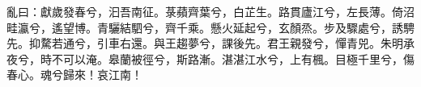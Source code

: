\begin{pinyinscope}
亂曰：獻歲發春兮，汩吾南征。菉蘋齊葉兮，白芷生。路貫廬江兮，左長薄。倚沼畦瀛兮，遙望博。青驪結駟兮，齊千乘。懸火延起兮，玄顏烝。步及驟處兮，誘騁先。抑騖若通兮，引車右還。與王趨夢兮，課後先。君王親發兮，憚青兕。朱明承夜兮，時不可以淹。皋蘭被徑兮，斯路漸。湛湛江水兮，上有楓。目極千里兮，傷春心。魂兮歸來！哀江南！


\end{pinyinscope}